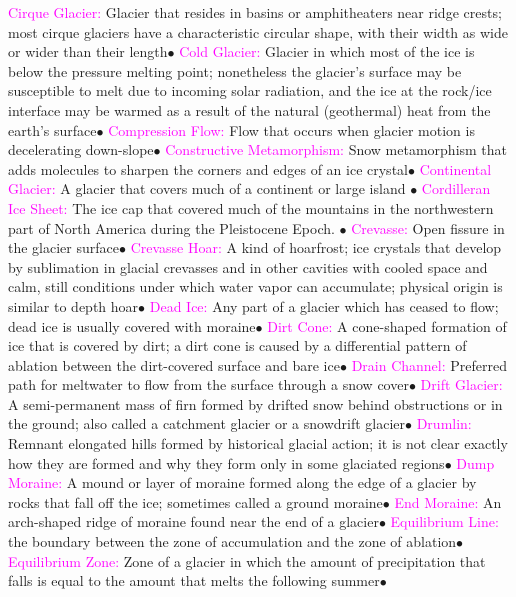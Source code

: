 \documentclass{article}
\newcommand{\ddd}{$\bullet$}
\newcommand{\pink}[1]{\textcolor{magenta}{#1}}
\newcommand{\vocab}[1]{{\pink{#1}}}
\begin{document}
\begin{multicols*}{4}
		\vocab{        Cirque Glacier: } Glacier that resides in basins or amphitheaters near ridge crests; most cirque glaciers have a characteristic circular shape, with their width as wide or wider than their length\ddd
		\vocab{        Cold Glacier: } Glacier in which most of the ice is below the pressure melting point; nonetheless the glacier’s surface may be susceptible to melt due to incoming solar radiation, and the ice at the rock/ice interface may be warmed as a result of the natural (geothermal) heat from the earth’s surface\ddd
		\vocab{        Compression Flow: } Flow that occurs when glacier motion is decelerating down-slope\ddd
		\vocab{        Constructive Metamorphism: } Snow metamorphism that adds molecules to sharpen the corners and edges of an ice crystal\ddd
		\vocab{ Continental Glacier: }A glacier that covers much of a continent or large island \ddd
		\vocab{Cordilleran Ice Sheet: }The ice cap that covered much of the mountains in the northwestern part of North America during the Pleistocene Epoch. \ddd
		\vocab{        Crevasse: } Open fissure in the glacier surface\ddd
		\vocab{        Crevasse Hoar: } A kind of hoarfrost; ice crystals that develop by sublimation in glacial crevasses and in other cavities with cooled space and calm, still conditions under which water vapor can accumulate; physical origin is similar to depth hoar\ddd
		\vocab{        Dead Ice: } Any part of a glacier which has ceased to flow; dead ice is usually covered with moraine\ddd
		\vocab{        Dirt Cone: } A cone-shaped formation of ice that is covered by dirt; a dirt cone is caused by a differential pattern of ablation between the dirt-covered surface and bare ice\ddd
		\vocab{        Drain Channel: } Preferred path for meltwater to flow from the surface through a snow cover\ddd
		\vocab{        Drift Glacier: } A semi-permanent mass of firn formed by drifted snow behind obstructions or in the ground; also called a catchment glacier or a snowdrift glacier\ddd
		\vocab{        Drumlin: } Remnant elongated hills formed by historical glacial action; it is not clear exactly how they are formed and why they form only in some glaciated regions\ddd
		\vocab{        Dump Moraine: } A mound or layer of moraine formed along the edge of a glacier by rocks that fall off the ice; sometimes called a ground moraine\ddd
		\vocab{        End Moraine: } An arch-shaped ridge of moraine found near the end of a glacier\ddd
		\vocab{Equilibrium Line: }the boundary between the zone of accumulation and the zone of ablation\ddd
		\vocab{        Equilibrium Zone: } Zone of a glacier in which the amount of precipitation that falls is equal to the amount that melts the following summer\ddd

\end{multicols*}
\end{document}
